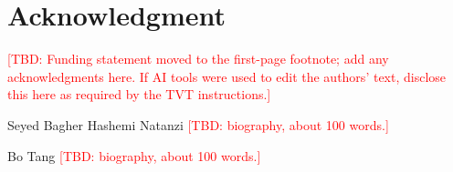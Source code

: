 \documentclass[journal]{IEEEtran}
\newcommand{\tbd}[1]{\textcolor{red}{[TBD: #1]}}
\begin{document}
\section*{Acknowledgment}
\tbd{Funding statement moved to the first-page footnote; add any
acknowledgments here. If AI tools were used to edit the authors' text,
disclose this here as required by the TVT instructions.}




\begin{IEEEbiographynophoto}{Seyed Bagher Hashemi Natanzi}
\tbd{biography, about 100 words.}
\end{IEEEbiographynophoto}

\begin{IEEEbiographynophoto}{Bo Tang}
\tbd{biography, about 100 words.}
\end{IEEEbiographynophoto}
\end{document}
